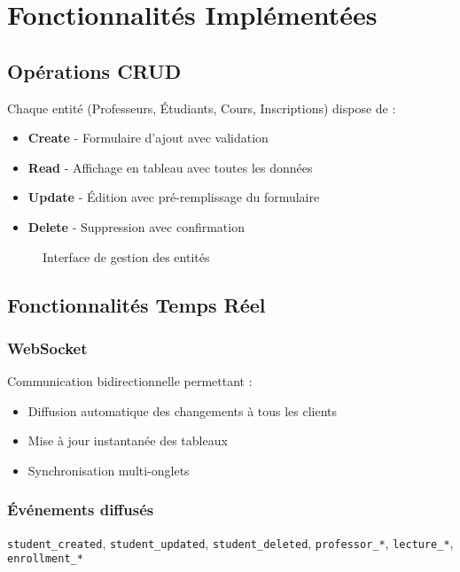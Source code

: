 \documentclass{article}
\begin{document}
\clearpage
\section{Fonctionnalités Implémentées}

\subsection{Opérations CRUD}

Chaque entité (Professeurs, Étudiants, Cours, Inscriptions) dispose de :

\begin{itemize}
    \item \textbf{Create} - Formulaire d'ajout avec validation
    \item \textbf{Read} - Affichage en tableau avec toutes les données
    \item \textbf{Update} - Édition avec pré-remplissage du formulaire
    \item \textbf{Delete} - Suppression avec confirmation
\end{itemize}

\begin{figure}[H]
    \centering
    \caption{Interface de gestion des entités}
\end{figure}

\subsection{Fonctionnalités Temps Réel}

\subsubsection{WebSocket}
Communication bidirectionnelle permettant :
\begin{itemize}
    \item Diffusion automatique des changements à tous les clients
    \item Mise à jour instantanée des tableaux
    \item Synchronisation multi-onglets
\end{itemize}

\subsubsection{Événements diffusés}
\texttt{student\_created}, \texttt{student\_updated}, \texttt{student\_deleted}, \texttt{professor\_*}, \texttt{lecture\_*}, \texttt{enrollment\_*}
\end{document}
